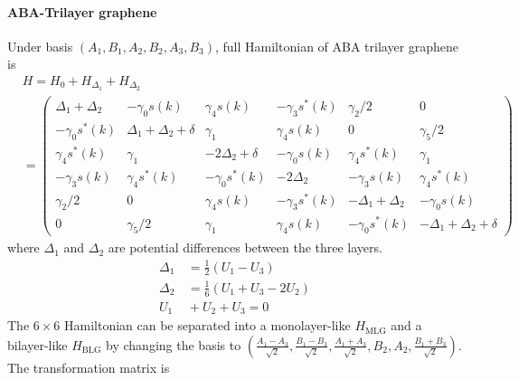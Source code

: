 \documentclass[12pt,a4paper]{article}
\begin{document}
\paragraph{ABA-Trilayer graphene}

    Under basis $\left(A_1, B_1, A_2, B_2, A_3, B_3\right)$, full Hamiltonian of ABA trilayer graphene is
    \begin{equation}
    \begin{aligned}
        & H = H_0 + H_{\Delta_1} + H_{\Delta_2} \\
        & = \begin{pmatrix}
        \Delta_1 + \Delta_2 & -\gamma_0 s(k)                & \gamma_4 s(k)         & -\gamma_3 s^*(k)  & \gamma_2/2            & 0                 \\
        -\gamma_0 s^*(k)    & \Delta_1 + \Delta_2 + \delta  & \gamma_1              & \gamma_4 s(k)     & 0                     & \gamma_5/2        \\
        \gamma_4 s^*(k)     & \gamma_1                      & -2\Delta_2 + \delta   & -\gamma_0 s(k)    & \gamma_4 s^*(k)       & \gamma_1          \\
        -\gamma_3 s(k)      & \gamma_4 s^*(k)               & -\gamma_0 s^*(k)      & -2\Delta_2        & -\gamma_3 s(k)        & \gamma_4 s^*(k)   \\
        \gamma_2/2          & 0                             & \gamma_4 s(k)         & -\gamma_3 s^*(k)  & -\Delta_1 + \Delta_2  & -\gamma_0 s(k)    \\
        0                   & \gamma_5/2                    & \gamma_1              & \gamma_4 s(k)     & -\gamma_0 s^*(k)      & -\Delta_1 + \Delta_2 + \delta
        \end{pmatrix}
    \end{aligned}
    \end{equation}
    where $\Delta_1$ and $\Delta_2$ are potential differences between the three layers.
    \begin{align*}
        \Delta_1 &\, = \frac{1}{2} \left(U_1 - U_3\right) \\
        \Delta_2 &\, = \frac{1}{6} \left(U_1 + U_3 - 2U_2\right) \\
        U_1 &\, + U_2 + U_3 = 0
    \end{align*}
    The $6\times6$ Hamiltonian can be separated into a monolayer-like $H_{\mathrm{MLG}}$ and a bilayer-like $H_{\mathrm{BLG}}$ by changing the basis to $\left(\frac{A_1-A_3}{\sqrt{2}}, \frac{B_1-B_3}{\sqrt{2}}, \frac{A_1+A_3}{\sqrt{2}}, B_2, A_2, \frac{B_1+B_3}{\sqrt{2}}\right)$. The transformation matrix is
\end{document}
